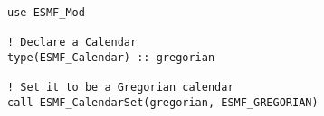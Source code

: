
\begin{verbatim}
use ESMF_Mod

! Declare a Calendar
type(ESMF_Calendar) :: gregorian

! Set it to be a Gregorian calendar
call ESMF_CalendarSet(gregorian, ESMF_GREGORIAN)

\end{verbatim}

